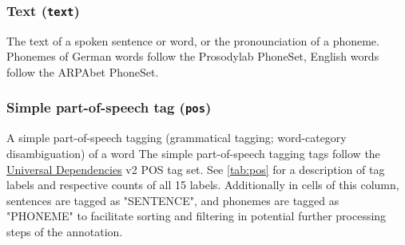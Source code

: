 \documentclass[10pt,a4paper,onecolumn]{article}
\begin{document}
\subsubsection*{Text (\texttt{text})}
The text of a spoken sentence or word, or the pronounciation of a phoneme.
Phonemes of German words follow the Prosodylab PhoneSet, English words follow the ARPAbet PhoneSet.


\subsubsection*{Simple part-of-speech tag (\texttt{pos})}
A simple part-of-speech tagging (grammatical tagging; word-category disambiguation) of a word
The simple part-of-speech tagging tags follow the \href{https://universaldependencies.org}{Universal Dependencies} v2 POS tag set.
See \ref{tab:pos} for a description of tag labels and respective counts of all 15 labels.
Additionally in cells of this column, sentences are tagged as "SENTENCE", and phonemes are tagged as "PHONEME" to facilitate sorting and filtering in potential further processing steps of the annotation.
\end{document}
